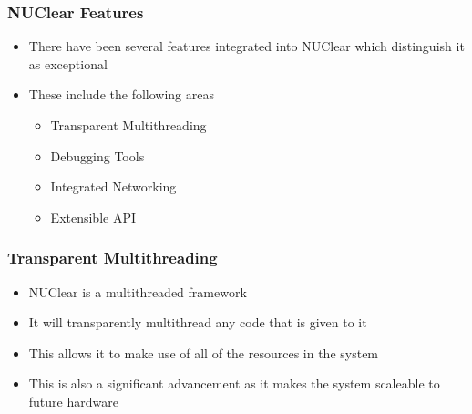 \documentclass{beamer}
\begin{document}
\begin{frame}
	\frametitle{NUClear Features}
	\begin{itemize}
		\item There have been several features integrated into NUClear which distinguish it as exceptional
		\item These include the following areas
		\begin{itemize}
			\item Transparent Multithreading
			\item Debugging Tools
			\item Integrated Networking
			\item Extensible API
		\end{itemize}
	\end{itemize}
\end{frame}

\begin{frame}
	\frametitle{Transparent Multithreading}
	\begin{itemize}
		\item NUClear is a multithreaded framework
		\item It will transparently multithread any code that is given to it
		\item This allows it to make use of all of the resources in the system
		\item This is also a significant advancement as it makes the system scaleable to future hardware
	\end{itemize}
\end{frame}
\end{document}
